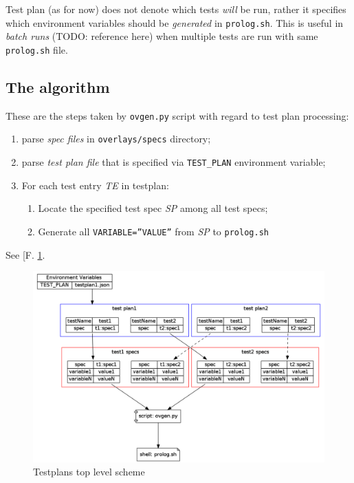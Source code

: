 Test plan (as for now) does not denote which tests \emph{will} be run, rather it specifies which environment variables should be \emph{generated} in \texttt{prolog.sh}. This is useful in \textit{batch runs} (TODO: reference here) when multiple tests are run with same \texttt{prolog.sh} file.


\subsection{The algorithm}
\label{sec:tp_algo}

These are the steps taken by \texttt{ovgen.py} script with regard to test plan processing:
\begin{enumerate}
\item parse  \textit{spec files} in \texttt{overlays/specs} directory;
\item parse \textit{test plan file} that is specified via \texttt{TEST\_PLAN}  environment variable;
\item For each test entry \textit{TE} in testplan:  \begin{enumerate}
  \item Locate the specified test spec \textit{SP} among all test specs;
  \item Generate all \texttt{VARIABLE=''VALUE''} from \textit{SP} to \texttt{prolog.sh}
    \end{enumerate}
  \end{enumerate}

  See [F. \ref{fig:tp_toplevel}.
  
  \begin{figure}[p]
    \centering
      \includegraphics*[width=16cm]{testplans_toplevel.png}
  \caption{Testplans top level scheme}
  \label{fig:tp_toplevel}
\end{figure}

